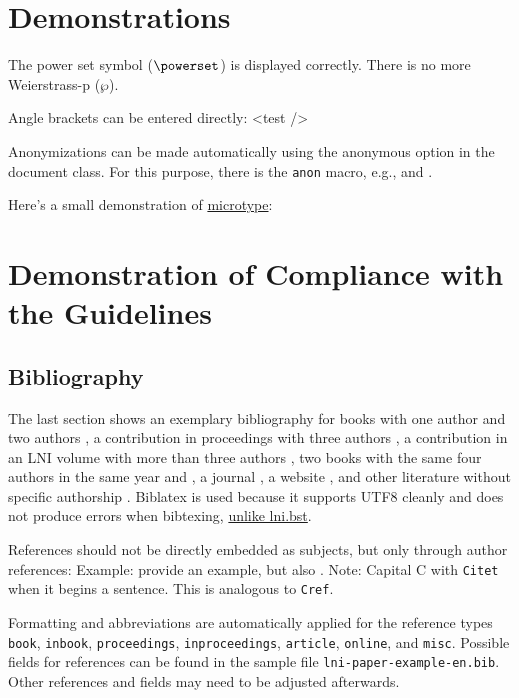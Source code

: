 \documentclass[biblatex]{lni}
\begin{document}
\section{Demonstrations}
\label{sec:demos}
The power set symbol ($\powerset$) is displayed correctly.
There is no more Weierstrass-p ($\wp$).

Angle brackets can be entered directly: <test />

Anonymizations can be made automatically using the anonymous option in the document class. For this purpose, there is the \texttt{anon} macro, e.g.,  and .

Here's a small demonstration of \href{https://www.ctan.org/pkg/microtype}{microtype}:
\blindtext

\section{Demonstration of Compliance with the Guidelines}
\label{sec:lniconformance}

\subsection{Bibliography}
The last section shows an exemplary bibliography for books with one author \cite{Ez10} and two authors \cite{AB00}, a contribution in proceedings with three authors \cite{ABC01}, a contribution in an LNI volume with more than three authors \cite{Az09}, two books with the same four authors in the same year \cite{Wa14} and \cite{Wa14b}, a journal \cite{Gl06}, a website \cite{GI19}, and other literature without specific authorship \cite{XX14}.
Biblatex is used because it supports UTF8 cleanly and does not produce errors when bibtexing, \href{https://github.com/gi-ev/LNI/issues/5}{unlike lni.bst}.

References should not be directly embedded as subjects, but only through author references:
Example:  provide an example, but also \citet{Az09}.
Note: Capital C with \texttt{Citet} when it begins a sentence. This is analogous to \texttt{Cref}.

Formatting and abbreviations are automatically applied for the reference types \texttt{book}, \texttt{inbook}, \texttt{proceedings}, \texttt{inproceedings}, \texttt{article}, \texttt{online}, and \texttt{misc}.
Possible fields for references can be found in the sample file \texttt{lni-paper-example-en.bib}.
Other references and fields may need to be adjusted afterwards.
\end{document}
